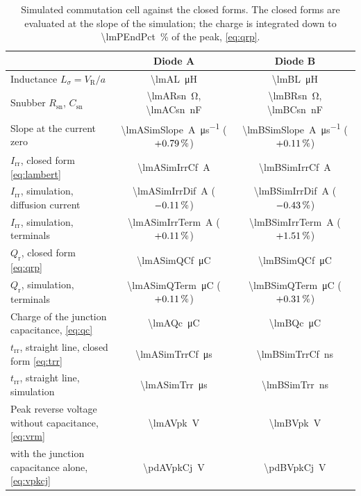 \documentclass[10pt,a4paper]{scrartcl}
\newcommand{\VR}{V_\mathrm{R}}
\newcommand{\Irr}{I_\mathrm{rr}}
\newcommand{\trr}{t_\mathrm{rr}}
\newcommand{\Csn}{C_\mathrm{sn}}
\newcommand{\Rsn}{R_\mathrm{sn}}
\newcommand{\Ls}{L_\sigma}                    %
\begin{document}
\begin{table}[htb]
\centering\small
\caption{Simulated commutation cell against the closed forms. The closed forms are evaluated at the slope of the simulation; the charge is integrated down to \SI{\lmPEndPct}{\percent} of the peak, \eqref{eq:qrp}.}
\label{tab:cell}
\begin{tabular}{@{}lcc@{}}
\toprule
 & Diode A & Diode B \\
\midrule
Inductance $\Ls = \VR/a$ & \SI{\lmAL}{\micro\henry} & \SI{\lmBL}{\micro\henry} \\
Snubber $\Rsn$, $\Csn$ & \SI{\lmARsn}{\ohm}, \SI{\lmACsn}{\nano\farad} & \SI{\lmBRsn}{\ohm}, \SI{\lmBCsn}{\nano\farad} \\
Slope at the current zero & \SI{\lmASimSlope}{\ampere\per\micro\second} ($+0.79\,\%$) & \SI{\lmBSimSlope}{\ampere\per\micro\second} ($+0.11\,\%$) \\
\addlinespace
$\Irr$, closed form \eqref{eq:lambert} & \SI{\lmASimIrrCf}{\ampere} & \SI{\lmBSimIrrCf}{\ampere} \\
$\Irr$, simulation, diffusion current & \SI{\lmASimIrrDif}{\ampere} ($-0.11\,\%$) & \SI{\lmBSimIrrDif}{\ampere} ($-0.43\,\%$) \\
$\Irr$, simulation, terminals & \SI{\lmASimIrrTerm}{\ampere} ($+0.11\,\%$) & \SI{\lmBSimIrrTerm}{\ampere} ($+1.51\,\%$) \\
\addlinespace
$Q_\mathrm{r}$, closed form \eqref{eq:qrp} & \SI{\lmASimQCf}{\micro\coulomb} & \SI{\lmBSimQCf}{\micro\coulomb} \\
$Q_\mathrm{r}$, simulation, terminals & \SI{\lmASimQTerm}{\micro\coulomb} ($+0.11\,\%$) & \SI{\lmBSimQTerm}{\micro\coulomb} ($+0.31\,\%$) \\
Charge of the junction capacitance, \eqref{eq:qc} & \SI{\lmAQc}{\micro\coulomb} & \SI{\lmBQc}{\micro\coulomb} \\
\addlinespace
$\trr$, straight line, closed form \eqref{eq:trr} & \SI{\lmASimTrrCf}{\micro\second} & \SI{\lmBSimTrrCf}{\nano\second} \\
$\trr$, straight line, simulation & \SI{\lmASimTrr}{\micro\second} & \SI{\lmBSimTrr}{\nano\second} \\
\addlinespace
Peak reverse voltage without capacitance, \eqref{eq:vrm} & \SI{\lmAVpk}{\volt} & \SI{\lmBVpk}{\volt} \\
\quad with the junction capacitance alone, \eqref{eq:vpkcj} & \SI{\pdAVpkCj}{\volt} & \SI{\pdBVpkCj}{\volt} \\

\end{tabular}
\end{table}
\end{document}
